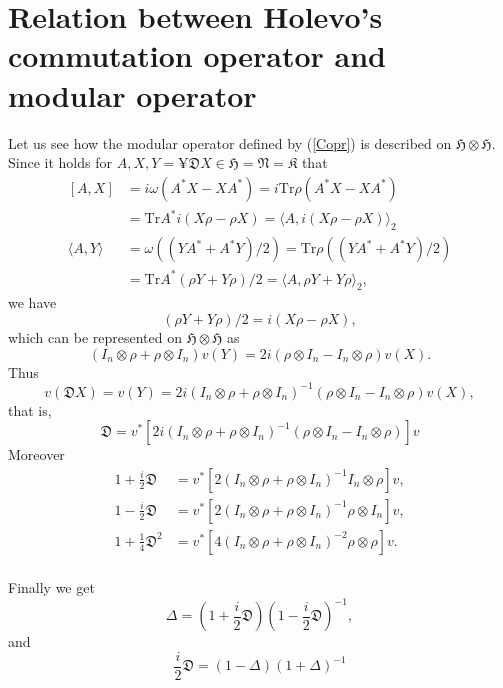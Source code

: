 \section{Relation between Holevo's commutation operator and modular operator}

Let us see how the modular operator defined by  (\ref{Copr}) is described on $\mathfrak{H}\otimes \mathfrak{H}$.
Since it holds for $A,X,Y=¥\mathfrak{D}X\in \mathfrak{H}=\mathfrak{N}=\mathfrak{K}$
that 
 \begin{equation}
 \begin{split}
 [A,X]&=i\omega(A^\ast X-XA^\ast)=i\mbox{Tr}\rho(A^\ast X-XA^\ast)\\
      &=\mbox{Tr}A^\ast i(X\rho-\rho X)=\langle A, i(X\rho-\rho X)\rangle_2\\
 \langle A,Y\rangle&=\omega((YA^\ast+A^\ast Y)/2)=\mbox{Tr}\rho((YA^\ast+A^\ast Y)/2)\\
 &=\mbox{Tr}A^\ast(\rho Y+Y\rho)/2=\langle A, \rho Y+Y\rho \rangle_2,
 \end{split}
 \end{equation}
  we have
 $$
 (\rho Y+Y\rho)/2=i(X\rho-\rho X),
 $$
 which can be represented on $\mathfrak{H}\otimes \mathfrak{H}$ as
	$$
	(I_n\otimes \rho + \rho\otimes I_n)v(Y)=2i(\rho\otimes I_n -I_n\otimes \rho )v(X).
	$$
	Thus 
	$$
	v(\mathfrak{D}X)=v(Y)=2i(I_n\otimes \rho + \rho\otimes I_n)^{-1}(\rho\otimes I_n -I_n\otimes \rho )v(X),
	$$
	that is,
	$$
	\mathfrak{D}=v^\ast[ 2i(I_n\otimes \rho + \rho\otimes I_n)^{-1}(\rho\otimes I_n -I_n\otimes \rho )]v
	$$
	  Moreover
	\begin{equation}
		\begin{split}
    1+\frac{i}{2}\mathfrak{D}&=v^\ast [ 2(I_n\otimes \rho+\rho\otimes I_n)^{-1}  I_n\otimes \rho]v,\\
    1-\frac{i}{2}\mathfrak{D}&=v^\ast [ 2(I_n\otimes \rho+\rho\otimes I_n)^{-1}\rho \otimes I_n]v,\\
    1+\frac{1}{4}\mathfrak{D}^2&=v^\ast[ 4(I_n\otimes \rho+\rho\otimes I_n)^{-2}\rho \otimes \rho]v.\\

    \end{split}
	\end{equation}

	Finally	we get
		$$
    \Delta=\left(1+\frac{i}{2}\mathfrak{D}\right)\left(1-\frac{i}{2}\mathfrak{D}\right)^{-1},
		$$
		and
		$$
     \frac{i}{2}\mathfrak{D}=(1-\Delta)(1+\Delta)^{-1}
		$$

